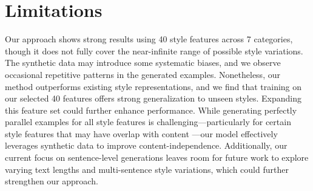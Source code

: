 \section * {Limitations}

Our approach shows strong results using 40 style features across 7 categories, though it does not fully cover the near-infinite range of possible style variations. The synthetic data may introduce some systematic biases, and we observe occasional repetitive patterns in the generated examples. Nonetheless, our method outperforms existing style representations, and we find that training on our selected 40 features offers strong generalization to unseen styles. Expanding this feature set could further enhance performance. While generating perfectly parallel examples for all style features is challenging---particularly for certain style features that may have overlap with content \citep{tstsurvey}---our model effectively leverages synthetic data to improve content-independence. Additionally, our current focus on sentence-level generations leaves room for future work to explore varying text lengths and multi-sentence style variations, which could further strengthen our approach.